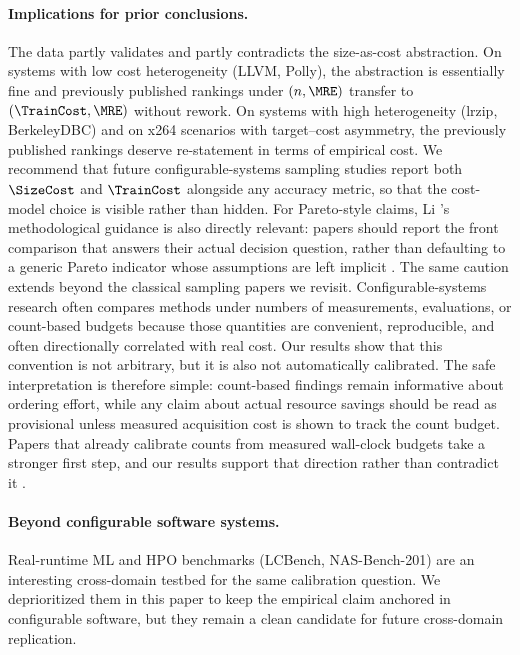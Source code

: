 \paragraph*{Implications for prior conclusions.}
The data partly validates and partly contradicts the size-as-cost
abstraction. On systems with low cost heterogeneity (LLVM, Polly), the
abstraction is essentially fine and previously published rankings under
$(n, \MRE)$ transfer to $(\TrainCost, \MRE)$ without rework. On systems
with high heterogeneity (lrzip, BerkeleyDBC) and on x264 scenarios with
target--cost asymmetry, the previously published rankings deserve
re-statement in terms of empirical cost. We recommend that future
configurable-systems sampling studies report both $\SizeCost$ and
$\TrainCost$ alongside any accuracy metric, so that the cost-model
choice is visible rather than hidden. For Pareto-style claims, Li \etal's
methodological guidance is also directly relevant: papers should report the
front comparison that answers their actual decision question, rather than
defaulting to a generic Pareto indicator whose assumptions are left implicit
\cite{li2020pareto}. The same caution extends beyond the classical sampling
papers we revisit. Configurable-systems research often compares methods under
numbers of measurements, evaluations, or count-based budgets because those
quantities are convenient, reproducible, and often directionally correlated
with real cost. Our results show that this convention is not arbitrary, but it
is also not automatically calibrated. The safe interpretation is therefore
simple: count-based findings remain informative about ordering effort, while
any claim about actual resource savings should be read as provisional unless
measured acquisition cost is shown to track the count budget. Papers that
already calibrate counts from measured wall-clock budgets take a stronger first
step, and our results support that direction rather than contradict it
\cite{chen2021multiobj,chen2023aspirations}.

\paragraph*{Beyond configurable software systems.}
Real-runtime ML and HPO benchmarks (\eg LCBench, NAS-Bench-201) are an
interesting cross-domain testbed for the same calibration question. We
deprioritized them in this paper to keep the empirical claim anchored
in configurable software, but they remain a clean candidate for future
cross-domain replication.
